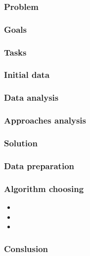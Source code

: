 \documentclass[xetex,mathserif,serif]{beamer}
\begin{document}
\begin{frame}
	\frametitle{Problem}

\end{frame}


\begin{frame}
	\frametitle{Goals}

\end{frame}


\begin{frame}
	\frametitle{Tasks}

\end{frame}


\begin{frame}
	\frametitle{Initial data}

\end{frame}




\begin{frame}
	\frametitle{Data analysis}

\end{frame}


\begin{frame}
	\frametitle{Approaches analysis}

\end{frame}


\begin{frame}
	\frametitle{Solution}

\end{frame}


\begin{frame}
	\frametitle{Data preparation}

\end{frame}


\begin{frame}
	\frametitle{Algorithm choosing}

	\begin{itemize}
		\item
		\item
		\item
	\end{itemize}
\end{frame}


\begin{frame}
	\frametitle{Conslusion}

\end{frame}
\end{document}
